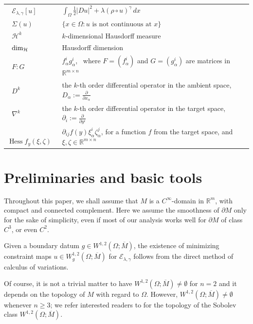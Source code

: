 \documentclass[11pt]{amsart}
\newcommand{\R}{{\mathbb R}}
\newcommand{\cE}{{\mathcal E}}
\newcommand{\cH}{{\mathcal H}}
\newcommand{\Hess}{\operatorname{Hess}}
\theoremstyle{plain}
\theoremstyle{definition}
\theoremstyle{remark}
\numberwithin{equation}{section}
\begin{document}
\begin{longtable}[l]{l l }
\,\,\,\,$\cE_{\lambda,\gamma}[u]$  &\qquad $\int_\Omega \frac{1}{2}|Du|^2 + \lambda(\rho\circ u)^\gamma \, dx$   \medskip \\ 
\,\,\,\,$\Sigma(u)$   &\qquad  $ \{ x\in\Omega: u\text{ is not continuous at }x\} $    \medskip \\   
\,\,\,\,$\cH^k$  &\qquad  $k$-dimensional Hausdorff measure    \medskip \\   
\,\,\,\,$\hbox{dim}_\cH$  &\qquad  Hausdorff dimension     \medskip\\    
\,\,\,\,$F:G$  &\qquad  $ f_\alpha^i g_\alpha^i$, \ where  $F = (f_\alpha^i)$ and  $G= (g_\alpha^i)$ are matrices in $\R^{m\times n}$    \medskip \\ 
\,\,\,\,$D^k$ &\qquad the $k$-th order differential operator in the ambient space, $D_\alpha := \frac{\partial}{\partial x_\alpha}$ \medskip \\
\,\,\,\,$\nabla^k$ &\qquad the $k$-th order differential operator in the target space, $\partial_i := \frac{\partial}{\partial y^i}$ \medskip \\
\,\,\,\,$\Hess f_y(\xi,\zeta)$  &\qquad $\partial_{ij} f(y)\xi_\alpha^i\zeta_\alpha^j$, for a function $f$ from the target space, and $\xi,\zeta \in \R^{m\times n}$ \medskip\\ 
\end{longtable}



\section{Preliminaries and basic tools}\label{sec:prelim}



Throughout this paper, we shall assume that $M$ is a $C^\infty$-domain in $\R^m$, with compact and connected complement. Here we assume the smoothness of $\partial M$ only for the sake of simplicity, even if most of our analysis works well for $\partial M$ of class $C^3$, or even $C^2$.  

Given a boundary datum $g\in W^{1,2}(\Omega;\overline M)$, the existence of minimizing constraint maps $u\in W_g^{1,2}(\Omega;\overline M)$ for $\cE_{\lambda,\gamma}$ follows from the direct method of calculus of variations. 

Of course, it is not a trivial matter to have $W^{1,2}(\Omega;\overline M)\neq\emptyset $ for $n = 2$ and it depends on the topology of $ M$ with regard  to $\Omega$.
However, $W^{1,2}(\Omega;\overline M)\neq\emptyset$ whenever $n\geq 3$; we refer interested  readers to \cite[Remark 2.9]{FGKS2} 
for the topology of the Sobolev class $W^{1,2}(\Omega;\overline M)$. 
\end{document}
